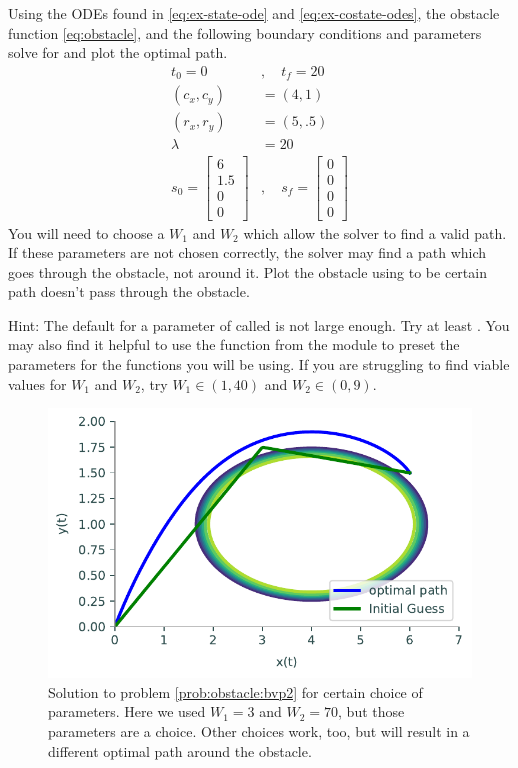 \begin{problem}
\label{prob:obstacle:bvp2}
Using the ODEs found in \ref{eq:ex-state-ode} and \ref{eq:ex-costate-odes}, the obstacle function \ref{eq:obstacle}, and the following boundary conditions and parameters solve for and plot the optimal path.
\begin{align*}
    t_0 = 0 &, \quad t_f = 20\\
    (c_x,c_y) &= (4,1)\\
    (r_x,r_y) &= (5,.5)\\
    \lambda &= 20\\
    s_0 = \begin{bmatrix}6\\1.5\\0\\0 \end{bmatrix}&, \quad s_f = \begin{bmatrix}0\\0\\0\\0 \end{bmatrix}
\end{align*}
You will need to choose a $W_1$ and $W_2$ which allow the solver to find a valid path.
If these parameters are not chosen correctly, the solver may find a path which goes through the obstacle, not around it.
Plot the obstacle using  to be certain path doesn't pass through the obstacle.

Hint: The default for a parameter of  called  is not large enough.
Try at least .
You may also find it helpful to use the function  from the module  to preset the parameters for the functions you will be using.
If you are struggling to find viable values for $W_1$ and $W_2$, try $W_1\in (1,40)$ and $W_2\in (0,9)$. 
\end{problem}

\begin{figure}[H]
    \centering
    \includegraphics[width=\textwidth]{figures/OA_prob2.pdf}
    \caption{Solution to problem \ref{prob:obstacle:bvp2} for certain choice of parameters.  Here we used $W_1=3$ and $W_2=70$, but those parameters are a choice.  Other choices work, too, but will result in a different optimal path around the obstacle.}
    \label{fig:OA_prob2}
\end{figure}

